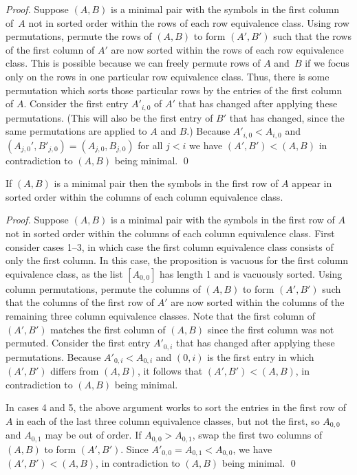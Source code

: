 \documentclass[runningheads]{llncs}
\begin{document}
\begin{proof}
Suppose $(A,B)$ is a minimal pair with the symbols in the first column of~$A$
not in sorted order within the rows of each row equivalence class.  Using row permutations,
permute the rows of $(A,B)$ to form $(A',B')$ such that the rows of the first column of $A'$
are now sorted within the rows of each row equivalence class.
This is possible because we can freely permute rows of $A$ and~$B$ if we focus
only on the rows in one particular row equivalence class.  Thus, there is
some permutation which sorts those particular rows by the entries of the first column of $A$.
Consider the first entry $A'_{i,0}$ of $A'$ that has changed after applying these permutations.
(This will also be the first entry of $B'$ that has changed, since the same permutations
are applied to $A$ and $B$.)  Because $A'_{i,0}<A_{i,0}$ and $(A_{j,0}',B'_{j,0})=(A_{j,0},B_{j,0})$ for all $j<i$ we have $(A',B')<(A,B)$
in contradiction to $(A,B)$ being minimal. \qed
\end{proof}

\begin{proposition}\label{prop:sort-row}
If $(A,B)$ is a minimal pair then the
symbols in the first row of\/ $A$ appear in sorted order within the columns of each column equivalence class.
\end{proposition}

\begin{proof}
Suppose $(A,B)$ is a minimal pair with the symbols in the first row of $A$
not in sorted order within the columns of each column equivalence class.
First consider cases 1--3, in which case the first column equivalence class
consists of only the first column.  In this case, the proposition is vacuous for the
first column equivalence class, as the list $[A_{0,0}]$ has length 1 and
is vacuously sorted.  Using column permutations, permute the columns of $(A,B)$
to form $(A',B')$ such that the columns of the first row of $A'$ are now
sorted within the columns of the remaining three column equivalence classes.
Note that the first column of $(A',B')$ matches the first column of $(A,B)$
since the first column was not permuted.  Consider the first entry $A'_{0,i}$
that has changed after applying these permutations.  Because $A'_{0,i}<A_{0,i}$
and $(0,i)$ is the first entry in which $(A',B')$ differs from $(A,B)$, it follows
that $(A',B')<(A,B)$, in contradiction to $(A,B)$ being minimal.

In cases 4 and 5, the above argument works to sort the entries in the first row of
$A$ in each of the last three column equivalence classes, but not the first, so
$A_{0,0}$ and $A_{0,1}$ may be out of order.
If $A_{0,0}>A_{0,1}$, swap the first two columns of $(A,B)$ to form $(A',B')$.
Since $A'_{0,0}=A_{0,1}<A_{0,0}$, we have $(A',B')<(A,B)$, in contradiction to
$(A,B)$ being minimal. \qed
\end{proof}
\end{document}
